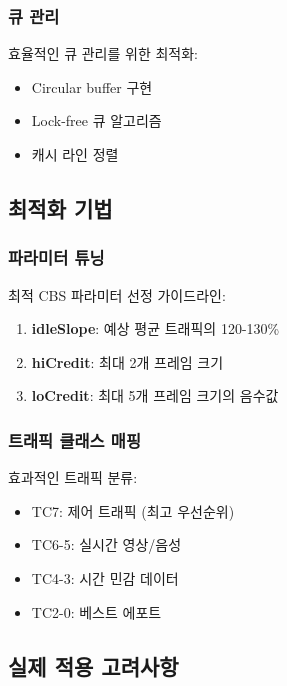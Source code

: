\documentclass[twocolumn,10pt]{article}
\begin{document}
\subsubsection{큐 관리}

효율적인 큐 관리를 위한 최적화:

\begin{itemize}
    \item Circular buffer 구현
    \item Lock-free 큐 알고리즘
    \item 캐시 라인 정렬
\end{itemize}

\subsection{최적화 기법}

\subsubsection{파라미터 튜닝}

최적 CBS 파라미터 선정 가이드라인:

\begin{enumerate}
    \item \textbf{idleSlope}: 예상 평균 트래픽의 120-130\%
    \item \textbf{hiCredit}: 최대 2개 프레임 크기
    \item \textbf{loCredit}: 최대 5개 프레임 크기의 음수값
\end{enumerate}

\subsubsection{트래픽 클래스 매핑}

효과적인 트래픽 분류:

\begin{itemize}
    \item TC7: 제어 트래픽 (최고 우선순위)
    \item TC6-5: 실시간 영상/음성
    \item TC4-3: 시간 민감 데이터
    \item TC2-0: 베스트 에포트
\end{itemize}

\subsection{실제 적용 고려사항}
\end{document}
